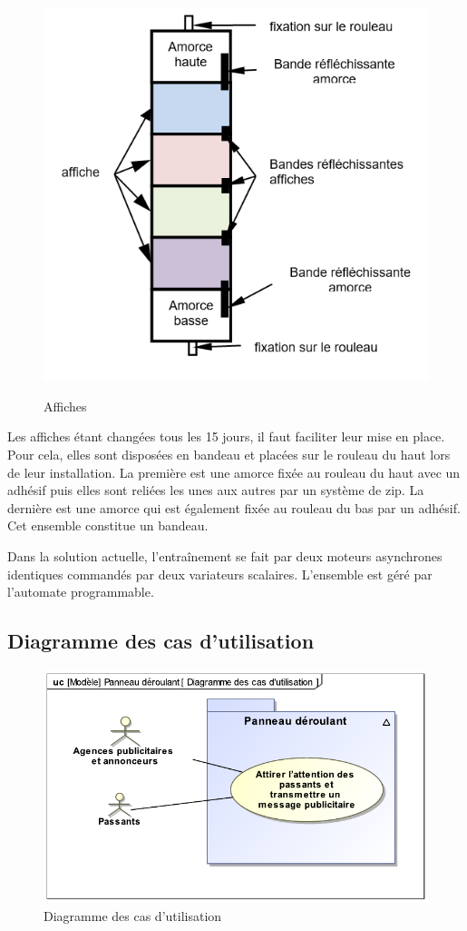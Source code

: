 \begin{figure}
  \includegraphics[width=0.9\linewidth]{img/fig00c}
  \label{fig00c}
  \caption{Affiches}
\end{figure}

Les affiches étant changées tous les 15 jours,  il faut faciliter leur mise en place. Pour cela, elles sont disposées en bandeau et placées sur le rouleau du haut lors de leur installation. La première est une amorce fixée au rouleau du haut avec un adhésif puis elles sont reliées les unes aux autres par un système de zip. La dernière est une amorce qui est également fixée au rouleau du bas par un adhésif. Cet ensemble constitue un bandeau.

Dans la solution actuelle, l'entraînement se fait par deux moteurs asynchrones identiques commandés par deux variateurs scalaires. L'ensemble est géré par l'automate programmable.

\subsection{Diagramme des cas d'utilisation}

\begin{figure}[!h]
\begin{center}
	\includegraphics[width=0.5\linewidth]{img/use_case}
\end{center}
	\label{use_case}
	\caption{Diagramme des cas d'utilisation}
\end{figure}

